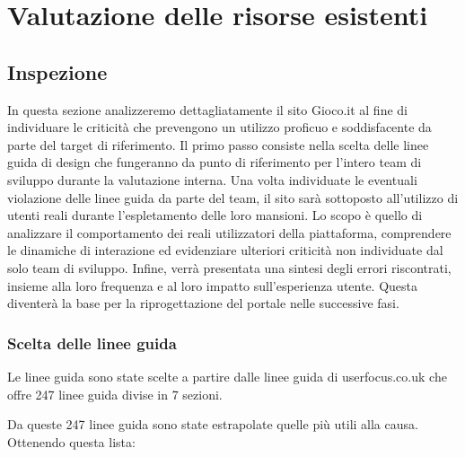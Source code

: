 \documentclass[../Report.tex]{subfiles}
\begin{document}
    \chapter{Valutazione delle risorse esistenti}
    \section{Inspezione}
    In questa sezione analizzeremo dettagliatamente il sito Gioco.it al fine di individuare le criticità che prevengono un utilizzo proficuo e soddisfacente da parte del target di riferimento. Il primo passo consiste nella scelta delle linee guida di design che fungeranno da punto di riferimento per l’intero team di sviluppo durante la valutazione interna. Una volta individuate le eventuali violazione delle linee guida da parte del team, il sito sarà sottoposto all’utilizzo di utenti reali durante l’espletamento delle loro mansioni. Lo scopo è quello di analizzare il comportamento dei reali utilizzatori della piattaforma, comprendere le dinamiche di interazione ed evidenziare ulteriori criticità non individuate dal solo team di sviluppo. Infine, verrà presentata una sintesi degli errori riscontrati, insieme alla loro frequenza e al loro impatto sull’esperienza utente. Questa diventerà la base per la riprogettazione del portale nelle successive fasi. 

    \subsection{Scelta delle linee guida}
    Le linee guida sono state scelte a partire dalle linee guida di userfocus.co.uk che offre 247 linee guida divise in 7 sezioni.

    Da queste 247 linee guida sono state estrapolate quelle più utili alla causa. Ottenendo questa lista:
\end{document}
